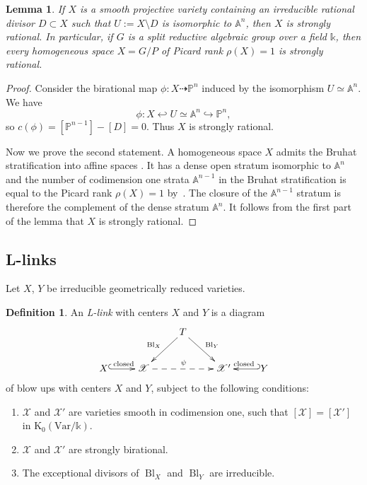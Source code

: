\documentclass[a4paper,12pt]{amsart}
\def\A{\mathbb A}
\def\k{\mathbb k}
\def\P{\mathbb P}
\def\XX{\mathcal X}
\def\Bl{{\operatorname{Bl}}}
\def\Kt{{\mathrm{K}}}
\def\Var{{\mathrm{Var}}}
\theoremstyle{plain}
\newtheorem{lemma}[dummy]{Lemma}
\numberwithin{equation}{section}
\theoremstyle{definition}
\newtheorem{Def}[dummy]{Definition}
\renewcommand{\(}{\left(}
\renewcommand{\)}{\right)}
\newcommand{\dto}{\dashrightarrow}
\newcommand{\hto}{\hookrightarrow}
\newcommand{\hlto}{\hookleftarrow}
\begin{document}
\begin{lemma}\label{lem:GP-strongly-rational}
If $X$ is a smooth projective variety
containing an irreducible rational
divisor $D \subset X$
such that $U := X \setminus D$
is isomorphic to $\A^n$,
then $X$ is strongly rational.
In particular, if $G$ is a split reductive
algebraic group over a field $\k$,
then every 
homogeneous space
$X = G/P$
of Picard rank $\rho(X) = 1$
is strongly rational.
\end{lemma}
\begin{proof}
Consider the birational map 
$\phi :  X \dto \P^n$
induced by the isomorphism $U \simeq \A^n$.
We have
\[
\phi: X \hlto U \simeq \A^n \hto \P^n,
\]
so $c(\phi) = [\P^{n-1}] - [D] = 0$.
Thus $X$ is strongly rational.

Now we prove the second statement. 
A homogeneous space $X$ admits
the Bruhat stratification
into affine spaces \cite[Proposition 1.3]{Kock}. 
It has a dense open stratum isomorphic to $\A^n$ and 
the number of codimension one strata 
$\A^{n-1}$ in the Bruhat stratification
is equal to the Picard rank $\rho(X) = 1$ by~\cite[Example 1.9.1]{Fulton}.
The closure of the
$\A^{n-1}$ stratum  
is therefore the complement of the dense stratum $\A^n$.
It follows from the first part of the lemma that $X$
is strongly rational.
\end{proof}





\subsection{L-links}
\hfill


Let $X$, $Y$ be 
irreducible geometrically reduced
varieties.

\begin{Def} 
An \emph{L-link} with centers $X$ and $Y$
is a diagram 
\begin{equation}\label{eq:L-link}
 \xymatrix{
    & & T \ar[dl]_{\Bl_{X}} \ar[dr]^{\Bl_{Y}} & & \\
    X \ar@{^{(}->}[r]^{\text{closed}} & \XX \ar@{-->}[rr]^\psi &  & \XX' & \ar@{_{(}->}[l]_{\text{closed}} Y\\
}
\end{equation}
of blow ups with centers $X$ and $Y$,
subject to the following conditions:
\begin{enumerate}
    \item[(L1)] $\XX$ and $\XX'$ are 
 varieties smooth in codimension one,
 such that $[\XX] = [\XX']$ in $\Kt_0(\Var/\k)$.
    \item[(L2)] 
    $\XX$ and $\XX'$ are strongly birational.
    \item[(L3)]
    The exceptional divisors of
    $\Bl_{X}$ and $\Bl_{Y}$ are irreducible.
\end{enumerate}
\end{Def}
\end{document}
